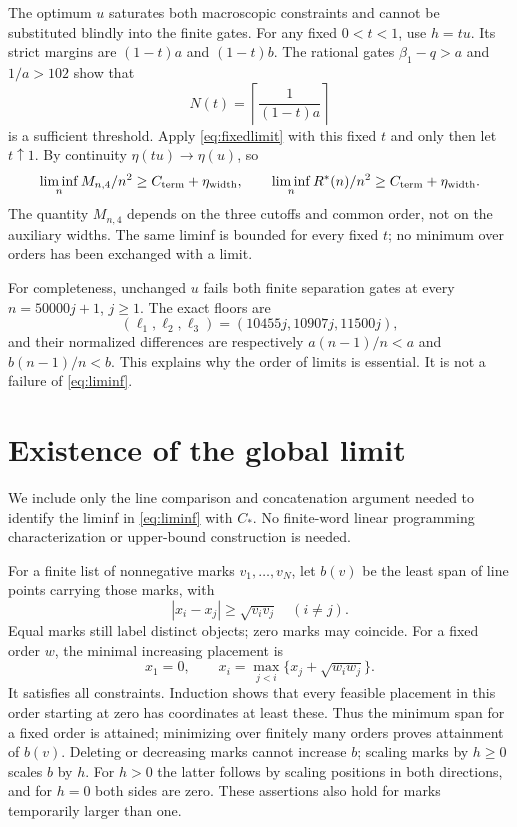 \documentclass[11pt,a4paper]{article}
\theoremstyle{remark}\newtheorem{remark}[theorem]{Remark}
\newcommand{\Rstar}{R^*}
\newcommand{\Cterm}{C_{\rm term}}
\newcommand{\etaw}{\eta_{\rm width}}
\begin{document}
The optimum $u$ saturates both macroscopic constraints and cannot be
substituted blindly into the finite gates. For any fixed $0<t<1$, use
$h=tu$. Its strict margins are $(1-t)a$ and $(1-t)b$. The rational
gates $\beta_1-q>a$ and $1/a>102$ show that
\[
N(t)=\left\lceil\frac1{(1-t)a}\right\rceil
\]
is a sufficient threshold. Apply \eqref{eq:fixedlimit} with this fixed
$t$ and only then let $t\uparrow1$. By continuity $\eta(tu)\to\eta(u)$,
so
\begin{equation}\label{eq:liminf}
\liminf_n M_{n,4}/n^2\ge\Cterm+\etaw,\qquad
\liminf_n\Rstar(n)/n^2\ge\Cterm+\etaw.
\end{equation}
The quantity $M_{n,4}$ depends on the three cutoffs and common order,
not on the auxiliary widths. The same liminf is bounded for every
fixed $t$; no minimum over orders has been exchanged with a limit.

For completeness, unchanged $u$ fails both finite separation gates at
every $n=50000j+1$, $j\ge1$. The exact floors are
\[
(\ell_1,\ell_2,\ell_3)=(10455j,10907j,11500j),
\]
and their normalized differences are respectively $a(n-1)/n<a$ and
$b(n-1)/n<b$. This explains why the order of limits is essential.
It is not a failure of \eqref{eq:liminf}.

\section{Existence of the global limit}\label{sec:existence}
We include only the line comparison and concatenation argument needed
to identify the liminf in \eqref{eq:liminf} with $C_*$. No finite-word
linear programming characterization or upper-bound construction is needed.

For a finite list of nonnegative marks $v_1,\ldots,v_N$, let $b(v)$ be
the least span of line points carrying those marks, with
\begin{equation}\label{eq:line}
|x_i-x_j|\ge\sqrt{v_iv_j}\quad(i\ne j).
\end{equation}
Equal marks still label distinct objects; zero marks may coincide.
For a fixed order $w$, the minimal increasing placement is
\[
x_1=0,\qquad x_i=\max_{j<i}\{x_j+\sqrt{w_iw_j}\}.
\]
It satisfies all constraints. Induction shows that every feasible
placement in this order starting at zero has coordinates at least these.
Thus the minimum span for a fixed order is attained; minimizing over
finitely many orders proves attainment of $b(v)$. Deleting or decreasing
marks cannot increase $b$; scaling marks by $h\ge0$ scales $b$ by $h$.
For $h>0$ the latter follows by scaling positions in both directions,
and for $h=0$ both sides are zero. These assertions also hold for marks
temporarily larger than one.
\end{document}
